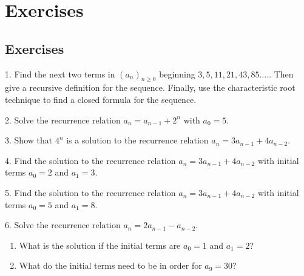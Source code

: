 \documentclass[10pt,]{book}
\theoremstyle{plain}
\theoremstyle{definition}
\numberwithin{equation}{chapter}
\begin{document}
\section[Exercises]{Exercises}\label{section-15}
\typeout{************************************************}
\typeout{************************************************}
\subsection[Exercises]{Exercises}\label{exercises-sec-recurrence}
\begin{exerciselist}
\item[1.]\hypertarget{exercise-172}{}
          Find the next two terms in \((a_n)_{n\ge 0}\) beginning \(3, 5, 11, 21, 43, 85\ldots.\). Then give a recursive definition for the sequence. Finally, use the characteristic root technique to find a closed formula for the sequence.
\par\smallskip
\item[2.]\hypertarget{exercise-173}{}
          Solve the recurrence relation \(a_n = a_{n-1} + 2^n\) with \(a_0 = 5\).
\par\smallskip
\item[3.]\hypertarget{exercise-174}{}
          Show that \(4^n\) is a solution to the recurrence relation \(a_n = 3a_{n-1} + 4a_{n-2}\).
\par\smallskip
\item[4.]\hypertarget{exercise-175}{}
          Find the solution to the recurrence relation \(a_n = 3a_{n-1} + 4a_{n-2}\) with initial terms \(a_0 = 2\) and \(a_1 = 3\).
\par\smallskip
\item[5.]\hypertarget{exercise-176}{}
          Find the solution to the recurrence relation \(a_n = 3a_{n-1} + 4a_{n-2}\) with initial terms \(a_0 = 5\) and \(a_1 = 8\).
\par\smallskip
\item[6.]\hypertarget{exercise-177}{}
          Solve the recurrence relation \(a_n = 2a_{n-1} - a_{n-2}\).
\leavevmode%
\begin{enumerate}[label=(\alph*)]
\item\hypertarget{li-576}{}
              What is the solution if the initial terms are \(a_0 = 1\) and \(a_1 = 2\)?
\item\hypertarget{li-577}{}
              What do the initial terms need to be in order for \(a_9 = 30\)?

\end{enumerate}
\end{exerciselist}
\end{document}
